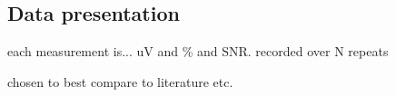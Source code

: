 \subsection{Data presentation}
each measurement is...
uV and \% and SNR. recorded over N repeats

chosen to best compare to literature etc.

